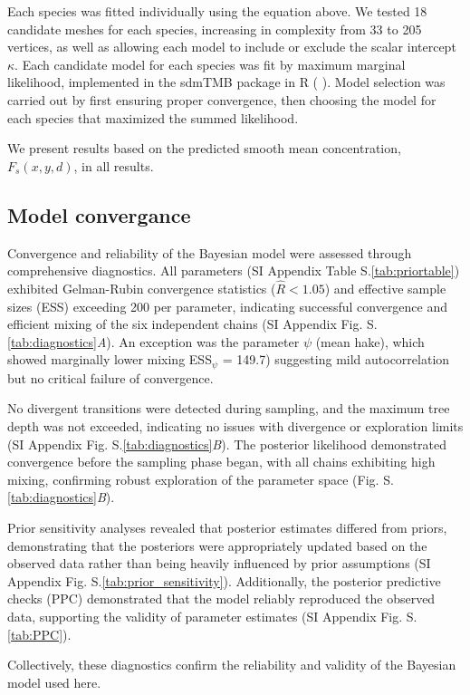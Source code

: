 \documentclass{article}
\begin{document}
Each species was fitted individually using the equation above. We tested 18 candidate meshes for each species, increasing in complexity from 33 to 205 vertices, as well as allowing each model to include or exclude the scalar intercept $\kappa$. Each candidate model for each species was fit by maximum marginal likelihood, implemented in the sdmTMB package in R ( \cite{anderson2022} ). Model selection was carried out by first ensuring proper convergence, then choosing the model for each species that maximized the summed likelihood.

We present results based on the predicted smooth mean concentration, $F_s(x,y,d)$, in all results.

\subsection*{Model convergance}

Convergence and reliability of the Bayesian model were assessed through comprehensive diagnostics. All parameters (SI Appendix Table S.\ref{tab:priortable}) exhibited Gelman-Rubin convergence statistics ($\hat{R} < 1.05$) and effective sample sizes (ESS) exceeding 200 per parameter, indicating successful convergence and efficient mixing of the six independent chains (SI Appendix Fig. S.\ref{tab:diagnostics}\textit{A}). An exception was the parameter $\psi$ (mean hake), which showed marginally lower mixing ESS$_\psi$ = 149.7) suggesting mild autocorrelation but no critical failure of convergence.

No divergent transitions were detected during sampling, and the maximum tree depth was not exceeded, indicating no issues with divergence or exploration limits (SI Appendix Fig. S.\ref{tab:diagnostics}\textit{B}). The posterior likelihood demonstrated convergence before the sampling phase began, with all chains exhibiting high mixing, confirming robust exploration of the parameter space (Fig. S.\ref{tab:diagnostics}\textit{B}).

Prior sensitivity analyses revealed that posterior estimates differed from priors, demonstrating that the posteriors were appropriately updated based on the observed data rather than being heavily influenced by prior assumptions (SI Appendix Fig. S.\ref{tab:prior_sensitivity}). Additionally, the posterior predictive checks (PPC) demonstrated that the model reliably reproduced the observed data, supporting the validity of parameter estimates (SI Appendix Fig. S.\ref{tab:PPC}). 

Collectively, these diagnostics confirm the reliability and validity of the Bayesian model used here.
\end{document}
